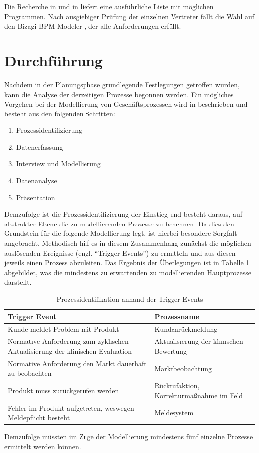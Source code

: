 \documentclass[a4paper,12pt]{report}
\begin{document}
Die Recherche in \citep[][]{Hesse} und in \citep[][]{Naef2012} liefert eine ausführliche Liste mit möglichen Programmen. Nach ausgiebiger Prüfung der einzelnen Vertreter fällt die Wahl auf den Bizagi BPM Modeler \citep[][]{Bizagi}, der alle Anforderungen erfüllt.

\section{Durchführung}\label{sec:durchfuehrung}
Nachdem in der Planungsphase grundlegende Festlegungen getroffen wurden, kann die Analyse der derzeitigen Prozesse begonnen werden. Ein mögliches Vorgehen bei der Modellierung von Geschäftsprozessen wird in \citep[vgl.][S. 13-17]{Jacka2009} beschrieben und besteht aus den folgenden Schritten:
\begin{enumerate}
\item Prozessidentifizierung
\item Datenerfassung
\item Interview und Modellierung
\item Datenanalyse
\item Präsentation
\end{enumerate}
Demzufolge ist die Prozessidentifizierung der Einstieg und besteht daraus, auf abstrakter Ebene die zu modellierenden Prozesse zu benennen. Da dies den Grundstein für die folgende Modellierung legt, ist hierbei besondere Sorgfalt angebracht. Methodisch hilf es in diesem Zusammenhang zunächst die möglichen auslösenden Ereignisse (engl. "`Trigger Events"') zu ermitteln und aus diesen jeweils einen Prozess abzuleiten. Das Ergebnis der Überlegungen ist in Tabelle \ref{tab:trigger_events} abgebildet, was die mindestens zu erwartenden zu modellierenden Hauptprozesse darstellt.
\begin{table}[ht]
\begin{center}
\begin{tabular}{|p{}|p{}|}
\hline
Trigger Event & Prozessname \\
\hline\hline
Kunde meldet Problem mit Produkt & Kundenrückmeldung \\
\hline
Normative Anforderung zum zyklischen Aktualisierung der klinischen Evaluation & Aktualisierung der klinischen Bewertung\\
\hline
Normative Anforderung den Markt dauerhaft zu beobachten & Marktbeobachtung \\
\hline
Produkt muss zurückgerufen werden & Rückrufaktion, Korrekturmaßnahme im Feld\\
\hline
Fehler im Produkt aufgetreten, weswegen Meldepflicht besteht & Meldesystem\\
\hline
\end{tabular}
\caption[Prozessidentifikation anhand der Trigger Events]{Prozessidentifikation anhand der Trigger Events}
\label{tab:trigger_events}
\end{center}
\end{table}
Demzufolge müssten im Zuge der Modellierung mindestens fünf einzelne Prozesse ermittelt werden können.
\end{document}
